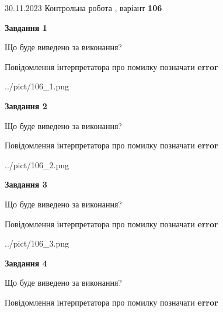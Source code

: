 \documentclass[12pt, ukrainian]{article}
\begin{document}
{{30.11.2023 Контрольна робота , варіант  \No \textbf { 106 }\par}}
{




{\begin {center}\textbf{Завдання 1}\end {center}}\par
Що буде виведено за виконання? \par
Повідомлення інтерпретатора про помилку позначати \textbf{error}

\begin{center}
	{../pict/106_1.png}
\end{center}
\newpage

{\begin {center}\textbf{Завдання 2}\end {center}}\par
Що буде виведено за виконання? \par
Повідомлення інтерпретатора про помилку позначати \textbf{error}

\begin{center}
	{../pict/106_2.png}
\end{center}
\newpage

{\begin {center}\textbf{Завдання 3}\end {center}}\par
Що буде виведено за виконання? \par
Повідомлення інтерпретатора про помилку позначати \textbf{error}

\begin{center}
	{../pict/106_3.png}
\end{center}
\newpage

{\begin {center}\textbf{Завдання 4}\end {center}}\par
Що буде виведено за виконання? \par
Повідомлення інтерпретатора про помилку позначати \textbf{error}

}
\end{document}
